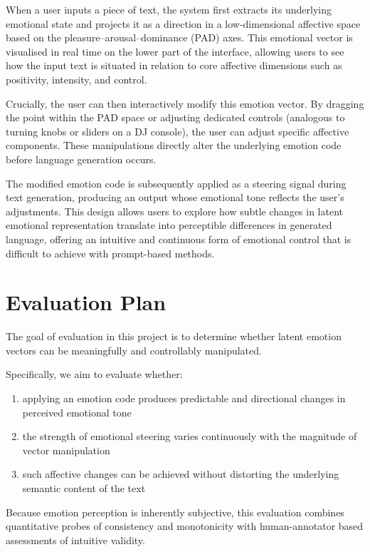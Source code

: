 \documentclass[12pt,twoside]{report}
\begin{document}
\begin{enumerate}
    When a user inputs a piece of text, the system first extracts its underlying emotional state and projects it as a direction in a low-dimensional affective space based on the pleasure–arousal–dominance (PAD) axes. This emotional vector is visualised in real time on the lower part of the interface, allowing users to see how the input text is situated in relation to core affective dimensions such as positivity, intensity, and control.

    Crucially, the user can then interactively modify this emotion vector. By dragging the point within the PAD space or adjusting dedicated controls (analogous to turning knobs or sliders on a DJ console), the user can adjust specific affective components. These manipulations directly alter the underlying emotion code before language generation occurs.

    The modified emotion code is subsequently applied as a steering signal during text generation, producing an output whose emotional tone reflects the user’s adjustments. This design allows users to explore how subtle changes in latent emotional representation translate into perceptible differences in generated language, offering an intuitive and continuous form of emotional control that is difficult to achieve with prompt-based methods.
\end{enumerate}

\chapter{Evaluation Plan}

The goal of evaluation in this project is to determine whether latent emotion vectors can be meaningfully and controllably manipulated.

Specifically, we aim to evaluate whether:

\begin{enumerate}
    \item applying an emotion code produces predictable and directional changes in perceived emotional tone
    \item the strength of emotional steering varies continuously with the magnitude of vector manipulation
    \item such affective changes can be achieved without distorting the underlying semantic content of the text
\end{enumerate}

Because emotion perception is inherently subjective, this evaluation combines quantitative probes of consistency and monotonicity with human-annotator based assessments of intuitive validity.
\end{document}
